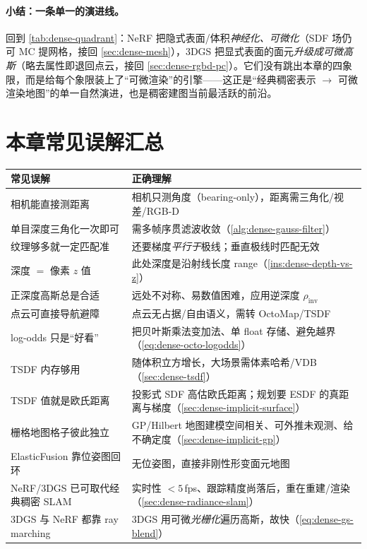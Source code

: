 \paragraph{小结：一条单一的演进线。}
回到 \cref{tab:dense-quadrant}：NeRF 把隐式表面/体积\emph{神经化、可微化}（SDF 场仍可 MC 提网格，接回 \cref{sec:dense-mesh}），3DGS 把显式表面的面元\emph{升级成可微高斯}（略去属性即退回点云，接回 \cref{sec:dense-rgbd-pc}）。它们没有跳出本章的四象限，而是给每个象限装上了“可微渲染”的引擎——这正是“经典稠密表示 $\to$ 可微渲染地图”的单一自然演进，也是稠密建图当前最活跃的前沿。

\section*{本章常见误解汇总}
\begin{table}[H]\centering\small
\begin{tabular}{p{} p{}}
\toprule
\textbf{常见误解} & \textbf{正确理解} \\
\midrule
相机能直接测距离 & 相机只测角度（bearing-only），距离需三角化/视差/RGB-D \\
单目深度三角化一次即可 & 需多帧序贯滤波收敛（\cref{alg:dense-gauss-filter}）\\
纹理够多就一定匹配准 & 还要梯度\emph{平行于}极线；垂直极线时匹配无效 \\
深度 $=$ 像素 $z$ 值 & 此处深度是沿射线长度 range（\cref{ins:dense-depth-vs-z}）\\
正深度高斯总是合适 & 远处不对称、易数值困难，应用逆深度 $\rho_{\mathrm{inv}}$ \\
点云可直接导航避障 & 点云无占据/自由语义，需转 OctoMap/TSDF \\
log-odds 只是“好看” & 把贝叶斯乘法变加法、单 float 存储、避免越界（\cref{eq:dense-octo-logodds}）\\
TSDF 内存够用 & 随体积立方增长，大场景需体素哈希/VDB（\cref{sec:dense-tsdf}）\\
TSDF 值就是欧氏距离 & 投影式 SDF 高估欧氏距离；规划要 ESDF 的真距离与梯度（\cref{sec:dense-implicit-surface}）\\
栅格地图格子彼此独立 & GP/Hilbert 地图建模空间相关、可外推未观测、给不确定度（\cref{sec:dense-implicit-gp}）\\
ElasticFusion 靠位姿图回环 & 无位姿图，直接非刚性形变面元地图 \\
NeRF/3DGS 已可取代经典稠密 SLAM & 实时性 $<5$\,fps、跟踪精度尚落后，重在重建/渲染（\cref{sec:dense-radiance-slam}）\\
3DGS 与 NeRF 都靠 ray marching & 3DGS 用可微\emph{光栅化}遍历高斯，故快（\cref{eq:dense-gs-blend}）\\
\bottomrule
\end{tabular}
\end{table}

